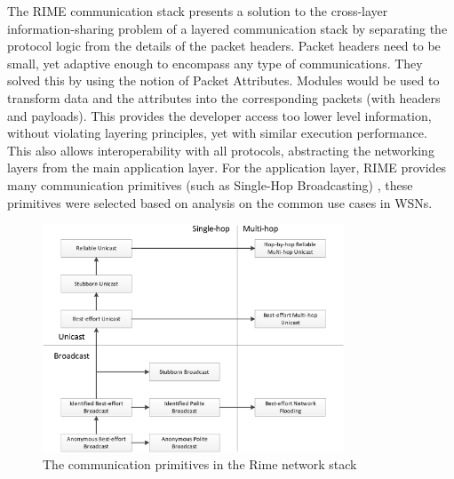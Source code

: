 The RIME communication stack presents a solution to the cross-layer information-sharing problem of a layered communication stack by separating the protocol logic from the details of the packet headers. Packet headers need to be small, yet adaptive enough to encompass any type of communications. They solved this by using the notion of Packet Attributes. Modules would be used to transform data and the attributes into the corresponding packets (with headers and payloads). This provides the developer access too lower level information, without violating layering principles, yet with similar execution performance. This also allows interoperability with all protocols, abstracting the networking layers from the main application layer. For the application layer, RIME provides many communication primitives (such as Single-Hop Broadcasting) \cite{Dunkels:2007:ACA:1322263.1322295}, these primitives were selected based on analysis on the common use cases in WSNs.

\begin{figure}[H]
	\centering
	\includegraphics[width=0.8\textwidth]{Diagrams/rime-stack}
	\caption{The communication primitives in the Rime network stack \cite{Dunkels:2007:ACA:1322263.1322295}}
\end{figure}

